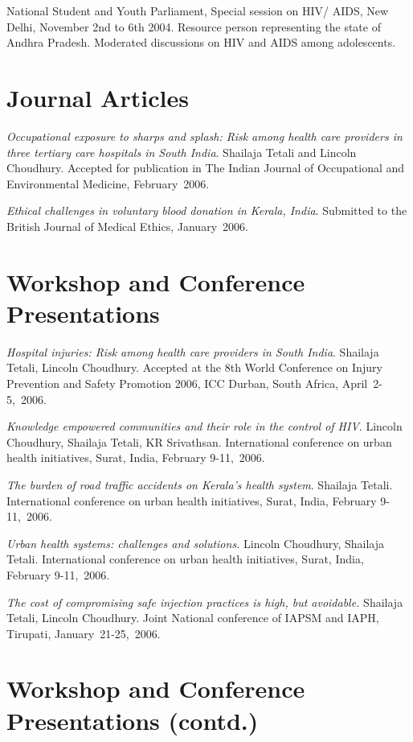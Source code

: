 \documentclass[margin,line]{res}
\begin{document}
\begin{resume}
National Student and Youth Parliament, Special session on HIV/
AIDS, New Delhi, November 2nd to 6th 2004.  Resource person
representing the state of Andhra Pradesh.  Moderated discussions
on HIV and AIDS among adolescents.

\section{\sc Journal Articles}

\emph{Occupational exposure to sharps and splash: Risk among
  health care providers in three tertiary care hospitals in
  South India}.  Shailaja Tetali and Lincoln Choudhury.
Accepted for publication in The Indian Journal of
Occupational and Environmental Medicine, February~2006.

\emph{Ethical challenges in voluntary blood donation in
Kerala, India}.  Submitted to the British Journal of Medical
Ethics, January~2006.

\section{\sc Workshop and Conference Presentations }



\emph{Hospital injuries: Risk among health care providers in
South India}.  Shailaja Tetali, Lincoln Choudhury.  Accepted
at the 8th World Conference on Injury Prevention and Safety
Promotion 2006, ICC Durban, South Africa, April~2-5,~2006.

\emph{Knowledge empowered communities and their role in the
control of HIV}.  Lincoln Choudhury, Shailaja Tetali, KR
Srivathsan. International conference on urban health
initiatives, Surat, India, February 9-11,~2006.

\emph{The burden of road traffic accidents on Kerala's
health system}.  Shailaja Tetali. International conference
on urban health initiatives, Surat, India, February 9-11,~2006.

\emph{Urban health systems: challenges and solutions.}
Lincoln Choudhury, Shailaja Tetali. International conference
on urban health initiatives, Surat, India, February
9-11,~2006.

\emph{The cost of compromising safe injection practices is
high, but avoidable.}  Shailaja Tetali, Lincoln
Choudhury. Joint National conference of IAPSM and IAPH,
Tirupati, January~21-25,~2006.
\newpage
\section{\sc Workshop and Conference Presentations (contd.)}


\end{resume}
\end{document}
